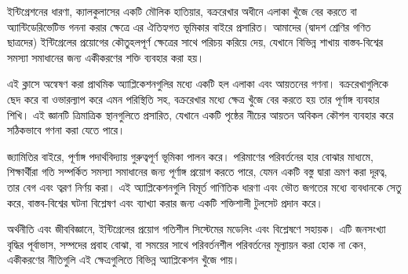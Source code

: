 ইন্টিগ্রেশনের ধারণা, ক্যালকুলাসের একটি মৌলিক হাতিয়ার, বক্ররেখার অধীনে এলাকা খুঁজে বের করতে বা অ্যান্টিডেরিভেটিভ গননা করার ক্ষেত্রে এর ঐতিহ্যগত ভূমিকার বাইরে প্রসারিত।
আমাদের (দ্বাদশ শ্রেণির গণিত ছাত্রদের) ইন্টিগ্রেলের প্রয়োগের কৌতুহলপূর্ণ ক্ষেত্রের সাথে পরিচয় করিয়ে দেয়, যেখানে বিভিন্ন শাখায় বাস্তব-বিশ্বের সমস্যা সমাধানের জন্য একীকরণের শক্তি ব্যবহার করা হয়।

এই ক্লাসে অন্বেষণ করা প্রাথমিক অ্যাপ্লিকেশনগুলির মধ্যে একটি হল এলাকা এবং আয়তনের গণনা।
বক্ররেখাগুলিকে ছেদ করে বা ওভারল্যাপ করে এমন পরিস্থিতি সহ, বক্ররেখার মধ্যে ক্ষেত্র খুঁজে বের করতে হয় তার পূর্ণাঙ্গ ব্যবহার শিখি। এই জ্ঞানটি ত্রিমাত্রিক স্থানগুলিতে প্রসারিত, যেখানে একটি পৃষ্ঠের নীচের আয়তন অবিকল কৌশল ব্যবহার করে সঠিকভাবে গণনা করা যেতে পারে।

জ্যামিতির বাইরে, পূর্ণাঙ্গ পদার্থবিদ্যায় গুরুত্বপূর্ণ ভূমিকা পালন করে। পরিমাণের পরিবর্তনের হার বোঝার মাধ্যমে, শিক্ষার্থীরা গতি সম্পর্কিত সমস্যা সমাধানের জন্য পূর্ণাঙ্গ প্রয়োগ করতে পারে, যেমন একটি বস্তু দ্বারা ভ্রমণ করা দূরত্ব, তার বেগ এবং ত্বরণ নির্ণয় করা।
এই অ্যাপ্লিকেশনগুলি বিমূর্ত গাণিতিক ধারণা এবং ভৌত জগতের মধ্যে ব্যবধানকে সেতু করে, বাস্তব-বিশ্বের ঘটনা বিশ্লেষণ এবং ব্যাখ্যা করার জন্য একটি শক্তিশালী টুলসেট প্রদান করে।

অর্থনীতি এবং জীববিজ্ঞানে, ইন্টিগ্রেলের প্রয়োগ গতিশীল সিস্টেমের মডেলিং এবং বিশ্লেষণে সহায়ক। এটি জনসংখ্যা বৃদ্ধির পূর্বাভাস, সম্পদের প্রবাহ বোঝা, বা সময়ের সাথে পরিবর্তনশীল পরিবর্তনের মূল্যায়ন করা হোক না কেন, একীকরণের নীতিগুলি এই ক্ষেত্রগুলিতে বিভিন্ন অ্যাপ্লিকেশন খুঁজে পায়।
\newpage
